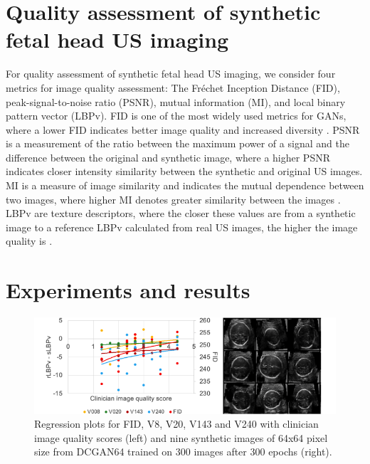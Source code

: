 \documentclass[runningheads]{llncs}
\begin{document}
\section{Quality assessment of synthetic fetal head US imaging}
For quality assessment of synthetic fetal head US imaging, we consider four metrics for image quality assessment: The Fr\'echet Inception Distance (FID), peak-signal-to-noise ratio (PSNR), mutual information (MI), and local binary pattern vector (LBPv). 
FID is one of the most widely used metrics for GANs, where a lower FID indicates better image quality and increased diversity \cite{heusel2017}.
PSNR is a measurement of the ratio between the maximum power of a signal and the difference between the original and synthetic image, where a higher PSNR indicates closer intensity similarity between the synthetic and original US images. 
MI is a measure of image similarity and indicates the mutual dependence between two images, where higher MI denotes greater similarity between the images \cite{wang2019}.
LBPv are texture descriptors, where the closer these values are from a synthetic image to a reference LBPv calculated from real US images, the higher the image quality is \cite{singh2018}. 

\section{Experiments and results}
\begin{figure}
\includegraphics[width=\textwidth]{../figures/results/versions/drawing-v03.png}%
\caption{Regression plots for FID, V8, V20, V143 and V240 with clinician image quality scores (left) and nine synthetic images of 64x64 pixel size from DCGAN64 trained on 300 images after 300 epochs (right).}\label{fig2}
\end{figure}
\end{document}
